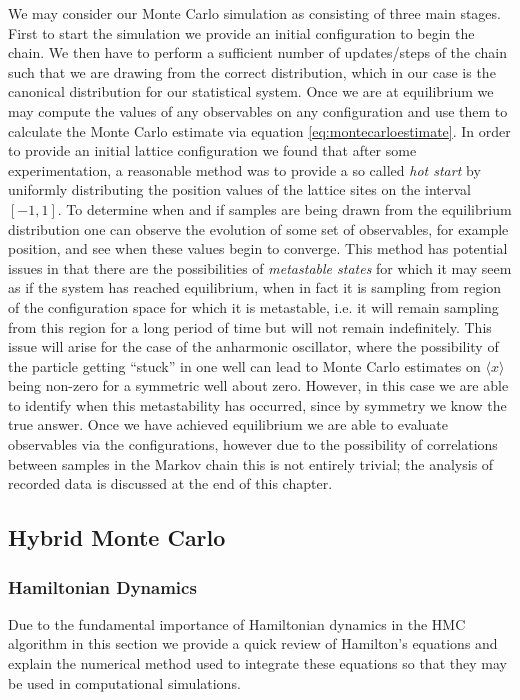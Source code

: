 \documentclass[12pt]{article}
\begin{document}
    We may consider our Monte Carlo simulation as consisting of three main stages. First to start the simulation we provide an initial configuration to begin the chain. We then have to perform a sufficient number of updates/steps of the chain such that we are drawing from the correct distribution, which in our case is the canonical distribution for our statistical system. Once we are at equilibrium we may compute the values of any observables on any configuration and use them to calculate the Monte Carlo estimate via equation \ref{eq:montecarloestimate}. In order to provide an initial lattice configuration we found that after some experimentation, a reasonable method was to provide a so called \textit{hot start} by uniformly distributing the position values of the lattice sites on the interval $\left[-1,1\right]$. To determine when and if samples are being drawn from the equilibrium distribution one can observe the evolution of some set of observables, for example position, and see when these values begin to converge. This method has potential issues in that there are the possibilities of \textit{metastable states} \cite{sokal_1997} for which it may seem as if the system has reached equilibrium, when in fact it is sampling from region of the configuration space for which it is metastable, i.e. it will remain sampling from this region for a long period of time but will not remain indefinitely. This issue will arise for the case of the anharmonic oscillator, where the possibility of the particle getting ``stuck'' in one well can lead to Monte Carlo estimates on $\langle x \rangle$ being non-zero for a symmetric well about zero. However, in this case we are able to identify when this metastability has occurred, since by symmetry we know the true answer. Once we have achieved equilibrium we are able to evaluate observables via the configurations, however due to the possibility of correlations between samples in the Markov chain this is not entirely trivial; the analysis of recorded data is discussed at the end of this chapter.



    \subsection{Hybrid Monte Carlo}
        \subsubsection{Hamiltonian Dynamics}
            \label{sec:HamiltonianDynamics}
            Due to the fundamental importance of Hamiltonian dynamics in the HMC algorithm in this section we provide a quick review of Hamilton's equations and explain the numerical method used to integrate these equations so that they may be used in computational simulations.
\end{document}
